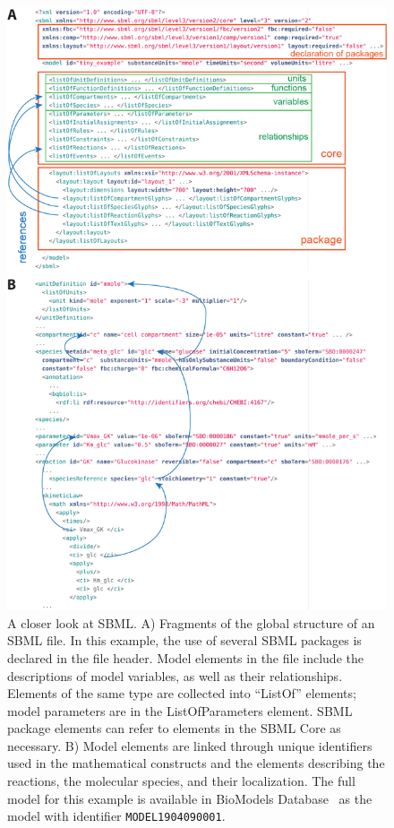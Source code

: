 \documentclass{sbml-paper}
\begin{document}
\begin{figure}[htb]
  \center
  \includegraphics[width=.79\textwidth]{resources/SBML_XML_example_v03.png}
  \caption{A closer look at SBML. A) Fragments of the global structure of an SBML file. In this example, the use of several SBML packages is declared in the file header. Model elements in the file include the descriptions of model variables, as well as their relationships.  Elements of the same type are collected into ``ListOf'' elements; \eg model parameters are in the ListOfParameters element. SBML package elements can refer to elements in the SBML Core as necessary. B) Model elements are linked through unique identifiers used in the mathematical constructs and the elements describing the reactions, the molecular species, and their localization. The full model for this example is available in BioModels Database~\citep{chelliah2014biomodels} as the model with identifier \texttt{MODEL1904090001}.}
\label{fig:examples-sbml}
\end{figure}


\clearpage
\newpage
\end{document}
